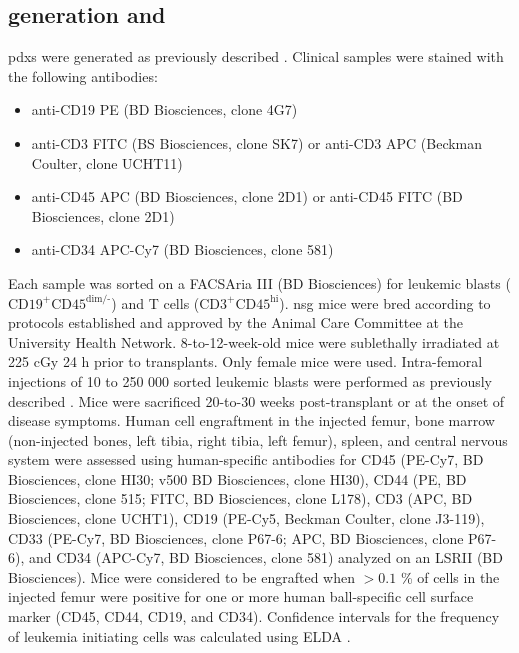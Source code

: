 \subsection{ generation and }

\Glspl{pdx} were generated as previously described \cite{dobsonRelapseFatedLatentDiagnosis2020}.
Clinical samples were stained with the following antibodies:

\begin{itemize}
  \item anti-CD19 PE (BD Biosciences, clone 4G7)
  \item anti-CD3 FITC (BS Biosciences, clone SK7) or anti-CD3 APC (Beckman Coulter, clone UCHT11)
  \item anti-CD45 APC (BD Biosciences, clone 2D1) or anti-CD45 FITC (BD Biosciences, clone 2D1)
  \item anti-CD34 APC-Cy7 (BD Biosciences, clone 581)
\end{itemize}

Each sample was sorted on a FACSAria III (BD Biosciences) for leukemic blasts ($\text{CD19}^+ \text{CD45}^{\text{dim/-}}$) and T cells ($\text{CD3}^+ \text{CD45}^{\text{hi}}$).
\Gls{nsg} mice were bred according to protocols established and approved by the Animal Care Committee at the University Health Network.
8-to-12-week-old mice were sublethally irradiated at 225 cGy 24 h prior to transplants.
Only female mice were used.
Intra-femoral injections of 10 to 250 000 sorted leukemic blasts were performed as previously described \cite{mazurierRapidMyeloerythroidRepopulation2003}.
Mice were sacrificed 20-to-30 weeks post-transplant or at the onset of disease symptoms.
Human cell engraftment in the injected femur, bone marrow (non-injected bones, left tibia, right tibia, left femur), spleen, and central nervous system were assessed using human-specific antibodies for CD45 (PE-Cy7, BD Biosciences, clone HI30; v500 BD Biosciences, clone HI30), CD44 (PE, BD Biosciences, clone 515; FITC, BD Biosciences, clone L178), CD3 (APC, BD Biosciences, clone UCHT1), CD19 (PE-Cy5, Beckman Coulter, clone J3-119), CD33 (PE-Cy7, BD Biosciences, clone P67-6; APC, BD Biosciences, clone P67-6), and CD34 (APC-Cy7, BD Biosciences, clone 581) analyzed on an LSRII (BD Biosciences).
Mice were considered to be engrafted when $> 0.1$ \% of cells in the injected femur were positive for one or more human \gls{ball}-specific cell surface marker (CD45, CD44, CD19, and CD34).
Confidence intervals for the frequency of leukemia initiating cells was calculated using ELDA \cite{huELDAExtremeLimiting2009}.

